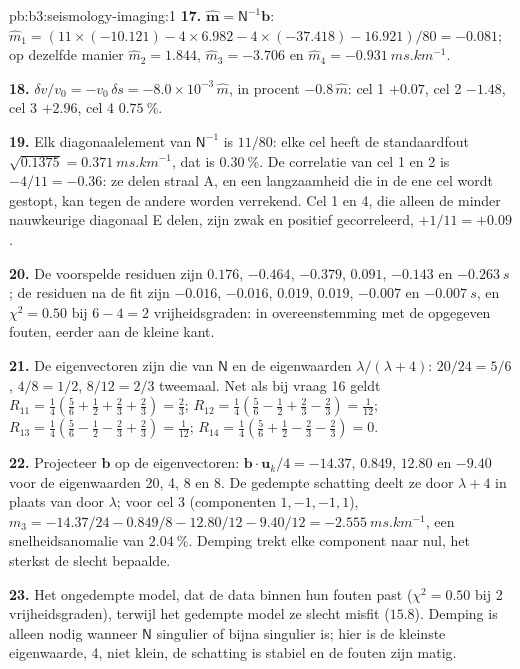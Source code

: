 \begin{solution}{pb:b3:seismology-imaging:1}
\textbf{17.} $\hat{\mathbf m} = \mathsf N^{-1}\mathbf b$:
$\hat m_1 = (11\times(-10.121) - 4\times6.982 - 4\times(-37.418) - 16.921)/80
= -0.081$; op dezelfde manier $\hat m_2 = 1.844$, $\hat m_3 = -3.706$ en
$\hat m_4 = \qty{-0.931}{ms.km^{-1}}$.

\textbf{18.} $\delta v/v_0 = -v_0\,\delta s = -8.0\times10^{-3}\,\hat m$, in procent
$-0.8\,\hat m$: cel 1 $+0.07$, cel 2 $-1.48$, cel 3 $+2.96$, cel 4
$\qty{+0.75}{\percent}$.

\textbf{19.} Elk diagonaalelement van $\mathsf N^{-1}$ is $11/80$: elke cel heeft
de standaardfout $\sqrt{0.1375} = \qty{0.371}{ms.km^{-1}}$, dat is
$\qty{0.30}{\percent}$. De correlatie van cel 1 en 2 is $-4/11 = -0.36$:
ze delen straal A, en een langzaamheid die in de ene cel wordt gestopt, kan
tegen de andere worden verrekend. Cel 1 en 4, die alleen de minder nauwkeurige
diagonaal E delen, zijn zwak en positief gecorreleerd, $+1/11 = +0.09$.

\textbf{20.} De voorspelde residuen zijn $0.176$, $-0.464$, $-0.379$, $0.091$,
$-0.143$ en $\qty{-0.263}{s}$; de residuen na de fit zijn $-0.016$,
$-0.016$, $0.019$, $0.019$, $-0.007$ en $\qty{-0.007}{s}$, en
$\chi^2 = 0.50$ bij $6 - 4 = 2$ vrijheidsgraden: in overeenstemming met de
opgegeven fouten, eerder aan de kleine kant.

\textbf{21.} De eigenvectoren zijn die van $\mathsf N$ en de eigenwaarden
$\lambda/(\lambda + 4)$: $20/24 = 5/6$, $4/8 = 1/2$, $8/12 = 2/3$ tweemaal. Net
als bij vraag 16 geldt $R_{11} = \tfrac14(\tfrac56 + \tfrac12 + \tfrac23 + \tfrac23) =
\tfrac23$; $R_{12} = \tfrac14(\tfrac56 - \tfrac12 + \tfrac23 - \tfrac23) =
\tfrac1{12}$; $R_{13} = \tfrac14(\tfrac56 - \tfrac12 - \tfrac23 + \tfrac23) =
\tfrac1{12}$; $R_{14} = \tfrac14(\tfrac56 + \tfrac12 - \tfrac23 - \tfrac23) = 0$.

\textbf{22.} Projecteer $\mathbf b$ op de eigenvectoren: $\mathbf b\cdot\mathbf u_k/4
= -14.37$, $0.849$, $12.80$ en $-9.40$ voor de eigenwaarden 20, 4, 8 en 8.
De gedempte schatting deelt ze door $\lambda + 4$ in plaats van door $\lambda$; voor
cel 3 (componenten $1, -1, -1, 1$),
$m_3 = -14.37/24 - 0.849/8 - 12.80/12 - 9.40/12 = \qty{-2.555}{ms.km^{-1}}$,
een snelheidsanomalie van $\qty{+2.04}{\percent}$. Demping trekt elke component
naar nul, het sterkst de slecht bepaalde.

\textbf{23.} Het ongedempte model, dat de data binnen hun fouten past
($\chi^2 = 0.50$ bij 2 vrijheidsgraden), terwijl het gedempte model ze slecht
misfit ($15.8$). Demping is alleen nodig wanneer $\mathsf N$ singulier of bijna
singulier is; hier is de kleinste eigenwaarde, 4, niet klein, de schatting is
stabiel en de fouten zijn matig.


\end{solution}

